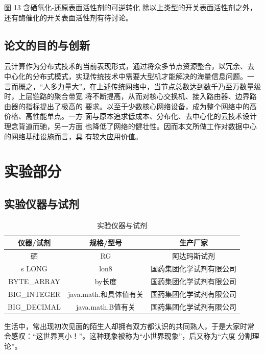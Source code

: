 \documentclass[bachelor,winfonts]{jnuthesis} %
\begin{document}
    图 13 含硒氧化-还原表面活性剂的可逆转化\cite{kong2016redox}
    除以上类型的开关表面活性剂之外，还有酶催化\cite{ku2011}的开关表面活性剂有待讨论。
    

    \section{论文的目的与创新}
    云计算作为分布式技术的当前表现形式，通过将众多节点资源整合，以冗余、去
    中心化的分布式模式，实现传统技术中需要大型机才能解决的海量信息问题。一
    言而概之，“人多力量大”。在上述传统网络中，当节点总数达到数千乃至万数量级时，上层链路的聚合带宽
    将不断提高，从而对核心交换机、接入路由器、边界路由器的指标提出了极高的
    要求。以至于少数核心网络设备，成为整个网络中的高价格、高性能单点。一方
    面与原本追求低成本、分布化、去中心化的云技术设计理念背道而驰，另一方面
    也降低了网络的健壮性。因而本文所做工作对数据中心的网络基础设施而言，具
    有较大应用价值。
    
    \chapter{实验部分}\label{chapter:experiment}
    \section{实验仪器与试剂}
        \begin{table}[htp]
        \centering
        \begin{tabular}{ccc}
            \toprule
            \textbf{仪器/试剂} & \textbf{规格/型号} & \textbf{生产厂家} \\
            \midrule
            硒   &  RG  & 阿达玛斯试剂 \\
s            LONG     & lon8  & 国药集团化学试剂有限公司 \\
            BYTE\_ARRAY & by长度 & 国药集团化学试剂有限公司 \\
            BIG\_INTEGER & java.math.和具体值有关 & 国药集团化学试剂有限公司 \\
            BIG\_DECIMAL & java.math.B值有关 & 国药集团化学试剂有限公司 \\
            \bottomrule
        \end{tabular}
        \caption{实验仪器与试剂}\label{table:实验仪器与试剂}
    \end{table}
    生活中，常出现初次见面的陌生人却拥有双方都认识的共同熟人，于是大家时常
    会感叹：“这世界真小！”。这种现象被称为``小世界现象''，后又称为``六度
    分割理论''。
    
\end{document}
